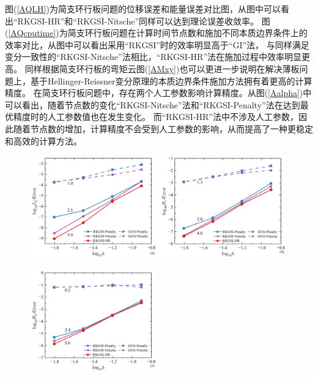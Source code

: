 图(\ref{AQLH})为简支环行板问题的位移误差和能量误差对比图，从图中可以看出“RKGSI-HR”和“RKGSI-Nitsche”同样可以达到理论误差收敛率。
图(\ref{AQcputime})为简支环行板问题在计算时间节点数和施加不同本质边界条件上的效率对比，从图中可以看出采用“RKGSI”时的效率明显高于“GI”法，
与同样满足变分一致性的“RKGSI-Nitsche”法相比，“RKGSI-HR”法在施加过程中效率明显更高。
同样根据简支环行板的弯矩云图(\ref{AMxy})也可以更进一步说明在解决薄板问题上，基于Hellinger-Reissner变分原理的本质边界条件施加方法拥有着更高的计算精度。
在简支环行板问题中，存在两个人工参数影响计算精度。从图(\ref{Aalpha})中可以看出，随着节点数的变化“RKGSI-Nitsche”法和“RKGSI-Penalty”法在达到最优精度时的人工参数值也在发生变化。
而“RKGSI-HR”法中不涉及人工参数，因此随着节点数的增加，计算精度不会受到人工参数的影响，从而提高了一种更稳定和高效的计算方法。
\begin{figure}[H]
    \centering
    \begin{subcaptiongroup}
    \includegraphics[width=0.49\textwidth]{figure/PHR/A/QL2.png}
    \label{QL2}
    \includegraphics[width=0.49\textwidth]{figure/PHR/A/QH1.png}
    \label{QH1}
    \end{subcaptiongroup}
    \begin{subcaptiongroup}
    \includegraphics[width=0.49\textwidth]{figure/PHR/A/QH2.png}

\end{subcaptiongroup}
\end{figure}
